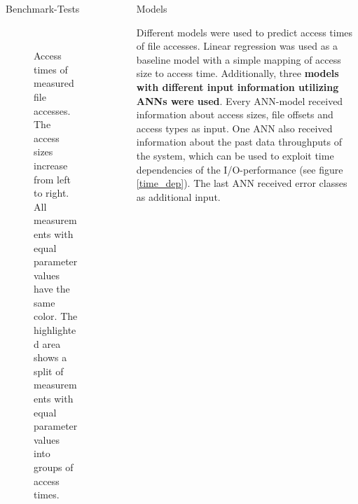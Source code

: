 \documentclass[final]{beamer}
\newlength{\sepwid}
\newlength{\onecolwid}
\begin{document}
\begin{frame}[t]
\begin{columns}[t]
\begin{column}{\onecolwid}
\begin{block}{Benchmark-Tests}
	\begin{figure}
		\\
		\vspace*{0.25cm}	
		\hspace*{-7.365cm}		
		\vspace*{-0.05cm}	
		\caption{Access times of measured file accesses. The access sizes increase from left to right. All measurements with equal parameter values have the same color. The highlighted area shows a split of measurements with equal parameter values into groups of access times.}
		\label{exploration}
	\end{figure} 
	
\end{block}
	
\end{column} %

\begin{column}{\sepwid}\end{column} %

\begin{column}{\onecolwid} %
	

\begin{block}{Models}
	
	Different models were used to predict access times of file accesses.
	Linear regression was used as a baseline model with a simple mapping of access size to access time.
	Additionally, three \textbf{models with different input information utilizing ANNs were used}.
	Every ANN-model received information about access sizes, file offsets and access types as input.
	One ANN also received information about the past data throughputs of the system, which can be used to exploit time dependencies of the I/O-performance (see figure \ref{time_dep}). The last ANN received error classes as additional input.
	

\end{block}
\end{column}
\end{columns}
\end{frame}
\end{document}
